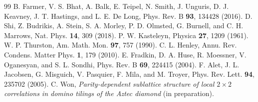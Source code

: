 \documentclass[10pt,twoside]{article}
\begin{document}
\begin{thebibliography}{99}
 B. Farmer, V. S. Bhat, A. Balk, E. Teipel, N. Smith, J. Unguris, D. J. Keavney, J. T. Hastings, and L. E. De Long, Phys. Rev. B \textbf{93}, 134428 (2016).
 D. Shi, Z. Budrikis, A. Stein, S. A. Morley, P. D. Olmsted, G. Burnell, and C. H. Marrows, Nat. Phys. \textbf{14}, 309 (2018).
 P. W. Kasteleyn, Physica \textbf{27}, 1209 (1961).
 W. P. Thurston, Am. Math. Mon. \textbf{97}, 757 (1990).
 C. L. Henley, Annu. Rev. Condens. Matter Phys. \textbf{1}, 179 (2010).
 E. Fradkin, D. A. Huse, R. Moessner, V. Oganesyan, and S. L. Sondhi, Phys. Rev. B \textbf{69}, 224415 (2004).
 F. Alet, J. L. Jacobsen, G. Misguich, V. Pasquier, F. Mila, and M. Troyer, Phys. Rev. Lett. \textbf{94}, 235702 (2005).
 C. Won, \emph{Parity-dependent sublattice structure of local $2\times2$ correlations in domino tilings of the Aztec diamond} (in preparation).
\end{thebibliography}
\end{document}
